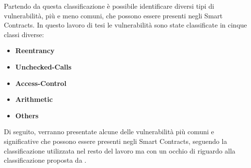 \documentclass[../../Thesis.tex]{subfiles}
\begin{document}
Partendo da questa classificazione \`e possibile identificare diversi tipi di vulnerabilit\`a, pi\`u e meno comuni, che possono essere presenti negli Smart Contracts. In questo lavoro di tesi le vulnerabilit\`a sono state classificate in cinque classi diverse:
\begin{itemize}
    \item \textbf{Reentrancy}
    \item \textbf{Unchecked-Calls}
    \item \textbf{Access-Control}
    \item \textbf{Arithmetic}
    \item \textbf{Others}
\end{itemize}

Di seguito, verranno presentate alcune delle vulnerabilit\`a pi\`u comuni e significative che possono essere presenti negli Smart Contracts, seguendo la classificazione utilizzata nel resto del lavoro ma con un occhio di riguardo alla classificazione proposta da \cite{sc-vulnerabilities}.
\end{document}

